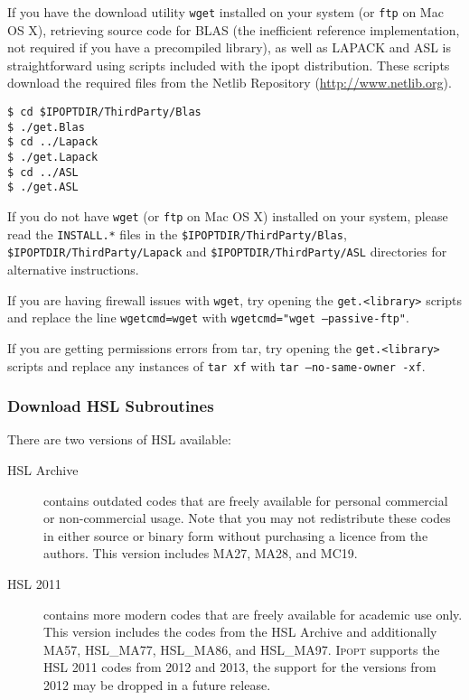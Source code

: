 \documentclass[10pt]{article}
\newcommand{\Ipopt}{\textsc{Ipopt}\xspace}
\begin{document}
If you have the download utility \texttt{wget} installed on your
system (or \texttt{ftp} on Mac OS X), retrieving source code for
BLAS (the inefficient reference
implementation, not required if you have a precompiled library), as
well as LAPACK and ASL is straightforward using scripts included with
the ipopt distribution.  These scripts download the required files
from the Netlib Repository
(\url{http://www.netlib.org}).
\medskip

\noindent
{\tt \$ cd \$IPOPTDIR/ThirdParty/Blas}\\
{\tt \$ ./get.Blas}\\
{\tt \$ cd ../Lapack}\\
{\tt \$ ./get.Lapack}\\
{\tt \$ cd ../ASL}\\
{\tt \$ ./get.ASL}
\medskip

\noindent
If you do not have \texttt{wget} (or \texttt{ftp} on Mac OS X) installed
on your system, please read the \texttt{INSTALL.*} files in the
\texttt{\$IPOPTDIR/ThirdParty/Blas},
\texttt{\$IPOPTDIR/ThirdParty/Lapack} and
\texttt{\$IPOPTDIR/ThirdParty/ASL} directories for alternative
instructions.

If you are having firewall issues with {\tt wget}, try opening the {\tt get.<library>} scripts and replace the line {\tt wgetcmd=wget} with {\tt wgetcmd="wget --passive-ftp"}.

If you are getting permissions errors from tar, try opening the {\tt get.<library>} scripts and replace any instances of {\tt tar xf} with {\tt tar --no-same-owner -xf}.

\subsubsection{Download HSL Subroutines}
\label{sec:HSL}

\noindent
There are two versions of HSL available:
\begin{description}
\item[HSL Archive] contains outdated codes that are freely available for
personal commercial or non-com\-mer\-cial usage. Note that you may not
redistribute these codes in either source or binary form without purchasing a
licence from the authors. This version includes MA27, MA28, and MC19.
\item[HSL 2011] contains more modern codes that are freely available for
academic use only. This version includes the codes from the HSL Archive and 
additionally MA57, HSL\_MA77, HSL\_MA86, and HSL\_MA97. \Ipopt supports the
HSL 2011 codes from 2012 and 2013, the support for the versions from 2012 may be
dropped in a future release.
\end{description}
\end{document}
